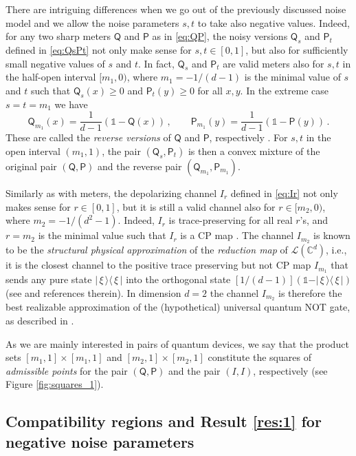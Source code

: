 \documentclass[12pt,reqno]{amsart}
\theoremstyle{definition}
\newcommand{\kb}[2]{\vert\,#1\,\rangle\langle\,#2\,\vert} %
\newcommand{\id}{\mathds{1}} %
\newcommand{\Qo}{\mathsf{Q}}%
\newcommand{\Po}{\mathsf{P}}%
\newcommand{\Cb}{\mathbb{C}} %
\newcommand{\lc}[1]{\mathcal{L}(\Cb^{#1})} %
\begin{document}
There are intriguing differences when we go out of the previously discussed noise model and we allow the noise parameters $s,t$ to take also negative values. 
Indeed, for any two sharp meters $\Qo$ and $\Po$ as in \eqref{eq:QP}, the noisy versions $\Qo_s$ and $\Po_t$ defined in \eqref{eq:QsPt} not only make sense for $s,t\in [0,1]$, but also for sufficiently small negative values of $s$ and $t$. 
In fact, $\Qo_s$ and $\Po_t$ are valid meters also for $s,t$ in the half-open interval $[m_1,0)$, where $m_1 = -1/(d-1)$ is the minimal value of $s$ and $t$ such that $\Qo_s(x)\geq 0$ and $\Po_t(y)\geq 0$ for all $x,y$. In the extreme case $s=t=m_1$ we have
$$
\Qo_{m_1}(x) = \frac{1}{d-1} \left( \id - \Qo(x) \right)\,,\qquad \Po_{m_1}(y) = \frac{1}{d-1} \left( \id - \Po(y) \right)\,.
$$
These are called the \emph{reverse versions} of $\Qo$ and $\Po$, respectively \cite{FiHeLe17}. For $s,t$ in the open interval $(m_1,1)$, the pair $(\Qo_s,\Po_t)$ is then a convex mixture of the original pair $(\Qo,\Po)$ and the reverse pair $(\Qo_{m_1},\Po_{m_1})$.

Similarly as with meters, the depolarizing channel $I_r$ defined in \eqref{eq:Ir} not only makes sense for $r\in [0,1]$, but it is still a valid channel also for $r\in [m_2,0)$, where $m_2 = -1/(d^2-1)$. Indeed, $I_r$ is trace-preserving for all real $r$'s, and $r=m_2$ is the minimal value such that $I_r$ is a CP map \cite{King03}. The channel $I_{m_2}$ is known to be the {\em structural physical approximation} of the {\em reduction map} of $\lc{d}$, i.e., it is the closest channel to the positive trace preserving but not CP map $I_{m_1}$ that sends any pure state $\kb{\xi}{\xi}$ into the orthogonal state $[1/(d-1)](\id-\kb{\xi}{\xi})$ (see \cite{Bae17} and references therein). In dimension $d=2$ the channel $I_{m_2}$ is therefore the best realizable approximation of the (hypothetical) universal quantum NOT gate, as described in \cite{BuHiWe99}.

As we are mainly interested in pairs of quantum devices, we say that the product sets $[m_1,1]\times[m_1,1]$ and $[m_2,1]\times[m_2,1]$ constitute the squares of {\em admissible points} for the pair $(\Qo,\Po)$ and the pair $(I,I)$, respectively (see Figure \ref{fig:squares_1}).

\subsection{Compatibility regions and Result \ref{res:1} for negative noise parameters}\label{sec:ext1}
\end{document}
